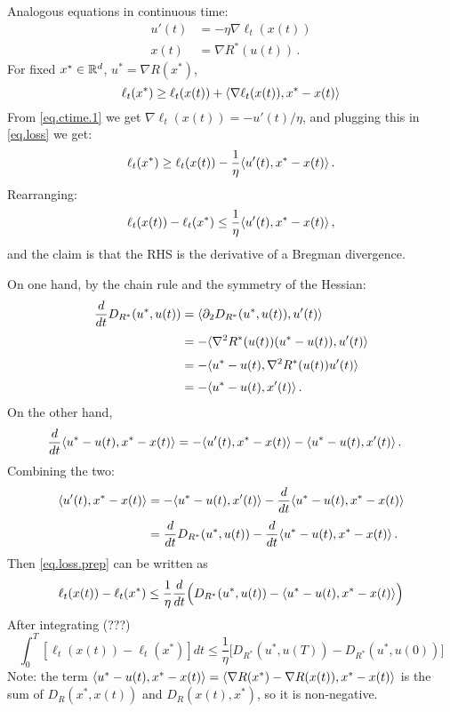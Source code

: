 \documentclass[12pt]{report}
\theoremstyle{plain}
\theoremstyle{definition}
\theoremstyle{remark}
\begin{document}
Analogous equations in continuous time:
\begin{align*}
u'(t) &= - \eta \nabla \ell_{t}(x(t)) \label{eq.ctime.1} \tag{1ct} \\
x(t) &= \nabla R^{*}(u(t))\,. \label{eq.ctime.2} \tag{2ct}
\end{align*}
For fixed $x^{*} \in \mathbb{R}^d$, $u^{*} = \nabla R(x^{*})$,
\setcounter{equation}{2}
\begin{equation}
\ell_{t}(x^{*}) \geq \ell_{t}(x(t)) + \langle {\nabla\ell_t(x(t)), x^{*} - x(t)}\rangle \label{eq.loss}
\end{equation}
From \eqref{eq.ctime.1} we get $\nabla \ell_{t}(x(t)) = -u'(t)/\eta$, 
and plugging this in \eqref{eq.loss} we get:
$$
\ell_{t}(x^{*}) \geq \ell_{t}(x(t)) - \frac{1}{\eta} \langle {u'(t), x^{*} - x(t)}\rangle\,.
$$
Rearranging:
\begin{equation}
\ell_{t}(x(t)) - \ell_{t}(x^{*}) \leq  \frac{1}{\eta} \langle {u'(t), x^{*} - x(t)}\rangle\,, \label{eq.loss.prep}
\end{equation}
and the claim is that the RHS is the derivative of a Bregman divergence.

\bigskip

On one hand, by the chain rule and the symmetry of the Hessian:
\begin{align*}
\frac{d}{dt} D_{R^{*}}(u^{*}, u(t))
&= \langle { \partial_{2} D_{R^{*}}(u^{*}, u(t)), u'(t)}\rangle \\[1mm]
&= - \langle { \nabla^2 R^{*}(u(t))(u^{*} -u(t)), u'(t) }\rangle \\[1mm]
&= - \langle { u^{*} -u(t), \nabla^2 R^{*}(u(t)) u'(t) }\rangle \\[1mm]
&= - \langle {u^{*} - u(t), x'(t)}\rangle\,.
\end{align*}
On the other hand,
\begin{align*}
\frac{d}{dt} \langle {u^{*} - u(t), x^{*} - x(t)}\rangle
&= - \langle { u'(t), x^{*} - x(t)}\rangle - \langle { u^{*} -u(t), x'(t) }\rangle\,.
\end{align*}
Combining the two:
\begin{align*}
\langle { u'(t), x^{*} - x(t)}\rangle 
&= - \langle { u^{*} -u(t), x'(t) }\rangle - \frac{d}{dt} \langle {u^{*} - u(t), x^{*} - x(t)}\rangle \\[1mm]
&= \frac{d}{dt} D_{R^{*}}(u^{*}, u(t)) - \frac{d}{dt} \langle {u^{*} - u(t), x^{*} - x(t)}\rangle\,.
\end{align*}
Then \eqref{eq.loss.prep} can be written as
\begin{equation*}
\ell_{t}(x(t)) - \ell_{t}(x^{*}) 
\leq  \frac{1}{\eta} \frac{d}{dt} \Bigl( D_{R^{*}}(u^{*}, u(t)) - \langle {u^{*} - u(t), x^{*} - x(t)}\rangle \Bigr)
\end{equation*}
After integrating (???)
$$
\int_{0}^{T} [\ell_{t}(x(t)) - \ell_{t}(x^{*})] dt
\leq \frac{1}{\eta} \bigl[ D_{R^{*}}(u^{*}, u(T)) - D_{R^{*}}(u^{*}, u(0)) \bigr]
$$
Note: the term 
$\langle {u^{*} - u(t), x^{*} - x(t)}\rangle = \langle {\nabla R(x^{*}) - \nabla R(x(t)), x^{*} - x(t)}\rangle$
is the sum of $D_{R}(x^{*}, x(t))$ and $D_{R}(x(t), x^{*})$, so it is non-negative.
\end{document}
